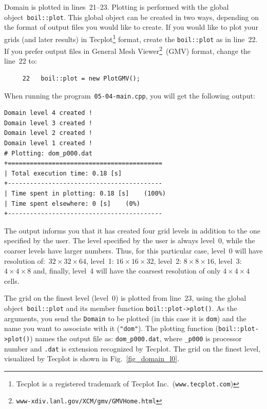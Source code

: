 Domain is plotted in lines~21--23. Plotting is performed with the global {\psiboil}
object~{\tt boil::plot}. This global object can be created in two ways, depending
on the format of output files you would like to create. If you would like to plot
your grids (and later results) in Tecplot\footnote{Tecplot is a registered trademark
of Tecplot Inc.\ ({\tt www.tecplot.com})} format,
create the {\tt boil::plot} as in line~22. If you prefer output files in General
Mesh Viewer\footnote{{\tt www-xdiv.lanl.gov/XCM/gmv/GMVHome.html}}~(GMV) format, 
change the line~22 to:
%
{\small \begin{verbatim}
     22   boil::plot = new PlotGMV();
\end{verbatim}}
%
When running the program~{\tt 05-04-main.cpp}, you will get the following output:
%
{\small \begin{verbatim}
Domain level 4 created !
Domain level 3 created !
Domain level 2 created !
Domain level 1 created !
# Plotting: dom_p000.dat
+==========================================
| Total execution time: 0.18 [s]
+------------------------------------------
| Time spent in plotting: 0.18 [s]    (100%)
| Time spent elsewhere: 0 [s]    (0%)
+------------------------------------------
\end{verbatim}}
%
The output informs you that it has created four grid levels in addition to the
one specified by the user. The level specified by the user is always level~0,
while the coarser levels have larger numbers. Thus, for this particular case,
level~0 will have resolution of:~$32 \times 32 \times 64$, 
level~1: $16 \times 16 \times 32$, level~2: $8 \times 8 \times 16$, 
level~3: $4 \times 4 \times 8$ and, finally, level~4 will have the coarsest 
resolution of only $4 \times 4 \times 4$ cells. 

The grid on the finest level (level~0) is plotted from line~23, using the global
object~{\tt boil::plot} and its member function {\tt boil::plot->plot()}. As the
arguments, you send the {\tt Domain} to be plotted (in this case it is {\tt dom})
and the name you want to associate with it ({\tt "dom"}). The plotting function
({\tt boil::plot->plot()}) names the output file as: {\tt dom\_p000.dat}, where
{\tt \_p000} is processor number and {\tt .dat} is extension recognized by
Tecplot. The grid on the finest level, visualized by Tecplot is shown in 
Fig.~\ref{fig_domain_l0}. 


